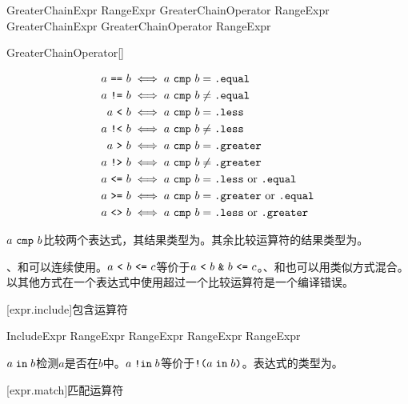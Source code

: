 \begin{bnf}{GreaterChainExpr}
    RangeExpr GreaterChainOperator RangeExpr \br
    GreaterChainExpr GreaterChainOperator RangeExpr
\end{bnf}

\begin{bnf}{GreaterChainOperator}[\oneof]
    \terminal{> == >=}
\end{bnf}

\begin{align*}
a\ \tcode{==}\ b &\iff a\ \tcode{cmp}\ b = \tcode{.equal} \\
a\ \tcode{!=}\ b &\iff a\ \tcode{cmp}\ b \ne \tcode{.equal} \\
a\ \tcode{<}\ b &\iff a\ \tcode{cmp}\ b = \tcode{.less} \\
a\ \tcode{!<}\ b &\iff a\ \tcode{cmp}\ b \ne \tcode{.less} \\
a\ \tcode{>}\ b &\iff a\ \tcode{cmp}\ b = \tcode{.greater} \\
a\ \tcode{!>}\ b &\iff a\ \tcode{cmp}\ b \ne \tcode{.greater} \\
a\ \tcode{<=}\ b &\iff a\ \tcode{cmp}\ b = \tcode{.less}\ \mathrm{or} \ \tcode{.equal} \\
a\ \tcode{>=}\ b &\iff a\ \tcode{cmp}\ b = \tcode{.greater}\ \mathrm{or} \ \tcode{.equal} \\
a\ \tcode{<>}\ b &\iff a\ \tcode{cmp}\ b = \tcode{.less}\ \mathrm{or} \ \tcode{.greater}
\end{align*}

\pnum
$a\ \tcode{cmp}\ b$比较两个表达式，其结果类型为。其余比较运算符的结果类型为。

\pnum
\tcode{<}、\tcode{<=}和\tcode{==}可以连续使用。$a\ \tcode{<}\ b\ \tcode{<=}\ c$等价于$a\ \tcode{<}\ b\ \tcode{\&}\ b\ \tcode{<=}\ c$。\tcode{>}、\tcode{>=}和\tcode{==}也可以用类似方式混合。以其他方式在一个表达式中使用超过一个比较运算符是一个编译错误。

[expr.include]{包含运算符}

\begin{bnf}{IncludeExpr}
    RangeExpr  RangeExpr \br
    RangeExpr \terminal{!}  RangeExpr
\end{bnf}

\pnum
$a \mathrel{\texttt{in}} b$检测$a$是否在$b$中。$a \mathrel{\texttt{!in}} b$等价于$\texttt{!(}a \mathrel{\texttt{in}} b\texttt{)}$。表达式的类型为。

[expr.match]{匹配运算符}

